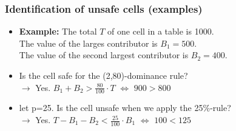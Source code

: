 \begin{frame}\frametitle{Identification of unsafe cells (examples)}
	\begin{itemize}
		\item {\bf Example:} The total $T$ of one cell in a table is 1000. \\
		The value of the larges contributor is $B_1=500$. \\
		The value of the second largest contributor is $B_2=400$. \pause
		\item Is the cell safe for the (2,80)-dominance rule? \pause \\
		$\longrightarrow$ Yes. $B_1+B_2 > \frac{80}{100} \cdot T$ $\Longleftrightarrow$ $900 > 800$ \pause
		\item let p=25. Is the cell unsafe when we apply the 25\%-rule? \pause \\
		$\longrightarrow$ Yes. $T-B_1-B_2 < \frac{25}{100} \cdot B_1$ $\Longleftrightarrow$ $100 < 125$ \pause
	\end{itemize}
\end{frame}



